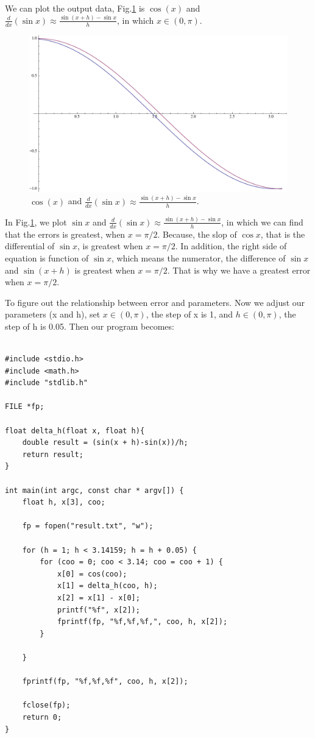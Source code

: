 \documentclass{article}
\begin{document}
We can plot the output data, Fig.\ref{fig1} is $\cos(x)$ and $\frac{d}{dx}(\sin{x}) \approx \frac{\sin{(x+h)}-\sin{x}}{h}$, in which $x\in(0, \pi)$.
\begin{figure}
    \centering
    \includegraphics[width=5.0in]{Fig1}
    \caption{$\cos(x)$ and $\frac{d}{dx}(\sin{x}) \approx \frac{\sin{(x+h)}-\sin{x}}{h}$.}
    \label{fig1}
\end{figure}

In Fig.\ref{fig1}, we plot $\sin{x}$ and $\frac{d}{dx}(\sin{x}) \approx \frac{\sin{(x+h)} -\sin{x}}{h}$, in which we can find that the errors is greatest, when $x=\pi/2$.
Because, the slop of $\cos{x}$, that is the differential of $\sin{x}$, is greatest when $x=\pi/2$. In addition, the right side of equation is function of $\sin{x}$, which means the numerator, the difference of $\sin{x}$ and $\sin{(x+h)}$ is greatest when $x=\pi/2$. That is why we have a greatest error when $x=\pi/2$.


To figure out the relationship between error and parameters. Now we adjust our parameters (x and h), set $x\in(0, \pi)$, the step of x is 1, and  $h\in(0, \pi)$, the step of h is 0.05. Then our program becomes:
\begin{lstlisting}

#include <stdio.h>
#include <math.h>
#include "stdlib.h"

FILE *fp;

float delta_h(float x, float h){
    double result = (sin(x + h)-sin(x))/h;
    return result;
}

int main(int argc, const char * argv[]) {
    float h, x[3], coo;
    
    fp = fopen("result.txt", "w");
    
    for (h = 1; h < 3.14159; h = h + 0.05) {
        for (coo = 0; coo < 3.14; coo = coo + 1) {
            x[0] = cos(coo);
            x[1] = delta_h(coo, h);
            x[2] = x[1] - x[0];
            printf("%f", x[2]);
            fprintf(fp, "%f,%f,%f,", coo, h, x[2]);
        }
        
    }

    fprintf(fp, "%f,%f,%f", coo, h, x[2]);
    
    fclose(fp);
    return 0;
}

\end{lstlisting}
\end{document}

